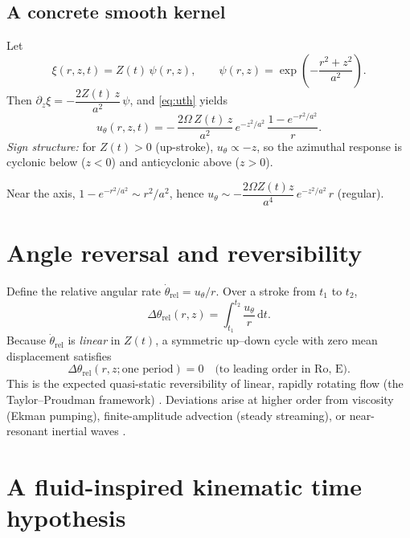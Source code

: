 \documentclass[12pt]{article}
\newcommand{\dd}{\mathrm{d}}
\newcommand{\p}{\partial}
\begin{document}
    \subsection{A concrete smooth kernel}
    Let
    \begin{equation}
        \xi(r,z,t)=Z(t)\,\psi(r,z),\qquad \psi(r,z)=\exp\!\left(-\frac{r^2+z^2}{a^2}\right).
    \end{equation}
    Then \(\p_z\xi = -\dfrac{2Z(t)\,z}{a^2}\,\psi\), and \eqref{eq:uth} yields
    \begin{equation}
        \boxed{\;
        u_\theta(r,z,t)
            = -\,\frac{2\Omega\,Z(t)\,z}{a^{2}}\,e^{-z^{2}/a^{2}}\,
            \frac{1-e^{-r^{2}/a^{2}}}{r}.
            \;} \label{eq:uth_gauss}
    \end{equation}
    \emph{Sign structure:} for \(Z(t)>0\) (up-stroke), \(u_\theta\propto -z\), so the azimuthal response is cyclonic below (\(z<0\)) and anticyclonic above (\(z>0\)).

    Near the axis, \(1-e^{-r^{2}/a^{2}}\sim r^2/a^2\), hence \(u_\theta\sim -\dfrac{2\Omega Z(t) z}{a^{4}}\,e^{-z^{2}/a^{2}}\,r\) (regular).

    \section{Angle reversal and reversibility}
    Define the relative angular rate \(\dot{\theta}_\text{rel}=u_\theta/r\). Over a stroke from \(t_1\) to \(t_2\),
    \begin{equation}
        \Delta \theta_\text{rel}(r,z)=\int_{t_1}^{t_2}\frac{u_\theta}{r}\,\dd t.
    \end{equation}
    Because \(\dot{\theta}_\text{rel}\) is \emph{linear} in \(Z(t)\), a symmetric up–down cycle with zero mean displacement satisfies
    \begin{equation}
        \boxed{\;\Delta \theta_\text{rel}(r,z; \text{one period})=0\quad\text{(to leading order in Ro, E).}\;}
    \end{equation}
    This is the expected quasi-static reversibility of linear, rapidly rotating flow (the Taylor–Proudman framework) \cite{Proudman1916,Taylor1923,Greenspan1968}. Deviations arise at higher order from viscosity (Ekman pumping), finite-amplitude advection (steady streaming), or near-resonant inertial waves \cite{Greenspan1968,Vallis2017}.

    \section{A fluid-inspired kinematic time hypothesis}
\end{document}
